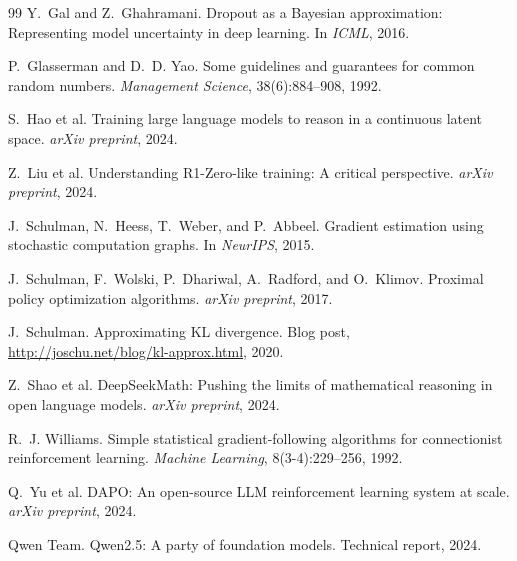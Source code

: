\documentclass[11pt]{article}
\theoremstyle{definition}
\theoremstyle{remark}
\begin{document}

% 
\begin{thebibliography}{99}
Y.~Gal and Z.~Ghahramani.
\newblock Dropout as a Bayesian approximation: Representing model uncertainty in deep learning.
\newblock In \emph{ICML}, 2016.

P.~Glasserman and D.~D. Yao.
\newblock Some guidelines and guarantees for common random numbers.
\newblock \emph{Management Science}, 38(6):884--908, 1992.

S.~Hao et al.
\newblock Training large language models to reason in a continuous latent space.
\newblock \emph{arXiv preprint}, 2024.

Z.~Liu et al.
\newblock Understanding R1-Zero-like training: A critical perspective.
\newblock \emph{arXiv preprint}, 2024.

J.~Schulman, N.~Heess, T.~Weber, and P.~Abbeel.
\newblock Gradient estimation using stochastic computation graphs.
\newblock In \emph{NeurIPS}, 2015.

J.~Schulman, F.~Wolski, P.~Dhariwal, A.~Radford, and O.~Klimov.
\newblock Proximal policy optimization algorithms.
\newblock \emph{arXiv preprint}, 2017.

J.~Schulman.
\newblock Approximating KL divergence.
\newblock Blog post, \url{http://joschu.net/blog/kl-approx.html}, 2020.

Z.~Shao et al.
\newblock DeepSeekMath: Pushing the limits of mathematical reasoning in open language models.
\newblock \emph{arXiv preprint}, 2024.

R.~J. Williams.
\newblock Simple statistical gradient-following algorithms for connectionist reinforcement learning.
\newblock \emph{Machine Learning}, 8(3-4):229--256, 1992.

Q.~Yu et al.
\newblock DAPO: An open-source LLM reinforcement learning system at scale.
\newblock \emph{arXiv preprint}, 2024.

Qwen Team.
\newblock Qwen2.5: A party of foundation models.
\newblock Technical report, 2024.
\end{thebibliography}
\end{document}
